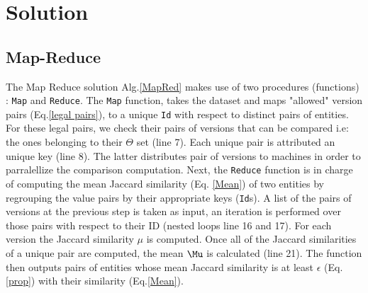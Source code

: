 \documentclass[sigconf]{acmart}
\begin{document}
\section{Solution}
\label{solutions}

\subsection{Map-Reduce}
The Map Reduce solution Alg.\ref{MapRed} makes use of two procedures (functions) : \texttt{Map} and \texttt{Reduce}. The \texttt{Map} function, takes the dataset and maps "allowed" version pairs (Eq.\ref{legal pairs}), to a unique \texttt{Id} with respect to distinct pairs of entities. For these legal pairs, we check their pairs of versions that can be compared i.e: the ones belonging to their  $\Theta$ set (line 7). Each unique pair is attributed an unique key (line 8).
The latter distributes pair of versions to machines in order to parralellize the comparison computation.  Next, the \texttt{Reduce} function is in charge of computing the mean Jaccard similarity (Eq. \ref{Mean}) of two entities by regrouping the value pairs by their appropriate keys (\texttt{Id}s). A list of the pairs of versions at the previous step is taken as input, an iteration is performed over those pairs with respect to their ID (nested loops line 16 and 17). For each version the Jaccard similarity $\mu$ is computed. Once all of the Jaccard similarities of a unique pair are computed, the mean $\Mu$ is calculated (line 21). The function then outputs pairs of entities whose mean Jaccard similarity is at least $\epsilon$ (Eq.\ref{prop}) with their similarity (Eq.\ref{Mean}).
\end{document}
